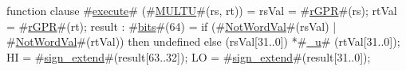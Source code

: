 function clause #\hyperref[zexecute]{execute}# (#\hyperref[zMULTU]{MULTU}#(rs, rt)) =
  {
    rsVal = #\hyperref[zrGPR]{rGPR}#(rs);
    rtVal = #\hyperref[zrGPR]{rGPR}#(rt);
    result : #\hyperref[zbits]{bits}#(64) = if (#\hyperref[zNotWordVal]{NotWordVal}#(rsVal) | #\hyperref[zNotWordVal]{NotWordVal}#(rtVal)) then
        undefined
      else
	(rsVal[31..0]) *#\hyperref[zzyu]{\_u}# (rtVal[31..0]);
    HI = #\hyperref[zsignzyextend]{sign\_extend}#(result[63..32]);
    LO = #\hyperref[zsignzyextend]{sign\_extend}#(result[31..0]);
  }
